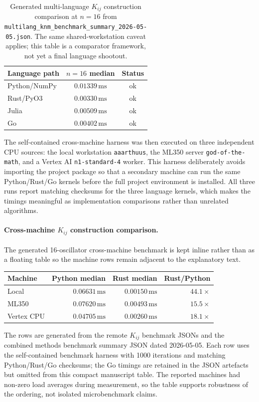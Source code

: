 \documentclass[preprint,aps,physrev,superscriptaddress,floatfix,longbibliography]{revtex4-2}
\begin{document}
\begin{table}[tb]
\centering
\small
\begin{tabular}{lcc}
\toprule
Language path & $n=16$ median & Status \\
\midrule
Python/NumPy & $0.01339\,\mathrm{ms}$ & ok \\
Rust/PyO3 & $0.00330\,\mathrm{ms}$ & ok \\
Julia & $0.00509\,\mathrm{ms}$ & ok \\
Go & $0.00402\,\mathrm{ms}$ & ok \\
\bottomrule
\end{tabular}
\caption{Generated multi-language $K_{ij}$ construction comparison at
$n=16$ from
\texttt{multilang\_knm\_benchmark\_summary\_2026-05-05.json}.
The same shared-workstation caveat applies; this table is a comparator
framework, not yet a final language shootout.}
\label{tab:multilang}
\end{table}

The self-contained cross-machine harness was then executed on three
independent CPU sources: the local workstation \texttt{aaarthuus}, the
ML350 server \texttt{god-of-the-math}, and a Vertex AI
\texttt{n1-standard-4} worker. This harness deliberately avoids importing
the project package so that a secondary machine can run the same
Python/Rust/Go kernels before the full project environment is installed.
All three runs report matching checksums for the three language kernels,
which makes the timings meaningful as implementation comparisons rather
than unrelated algorithms.

\paragraph*{Cross-machine $K_{ij}$ construction comparison.}
The generated 16-oscillator cross-machine benchmark is kept inline rather than
as a floating table so the machine rows remain adjacent to the explanatory
text.
\begin{center}
\small
\begin{tabular}{lrrr}
\toprule
Machine & Python median & Rust median & Rust/Python \\
\midrule
Local & $0.06631\,\mathrm{ms}$ & $0.00150\,\mathrm{ms}$ & $44.1\times$ \\
ML350 & $0.07620\,\mathrm{ms}$ & $0.00493\,\mathrm{ms}$ & $15.5\times$ \\
Vertex CPU & $0.04705\,\mathrm{ms}$ & $0.00260\,\mathrm{ms}$ & $18.1\times$ \\
\bottomrule
\end{tabular}
\end{center}
The rows are generated from the remote $K_{ij}$ benchmark JSONs and the
combined methods benchmark summary JSON dated 2026-05-05. Each row uses the
self-contained benchmark harness with 1000 iterations and matching
Python/Rust/Go checksums; the Go timings are retained in the JSON artefacts but
omitted from this compact manuscript table. The reported machines had non-zero
load averages during measurement, so the table supports robustness of the
ordering, not isolated microbenchmark claims.
\end{document}
